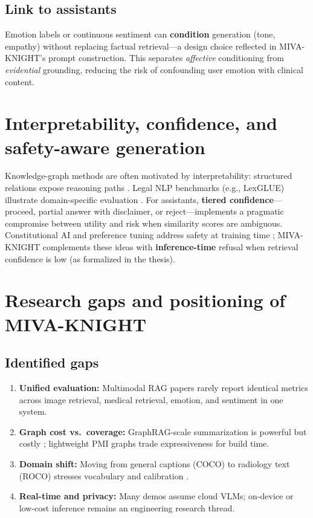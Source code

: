 \documentclass[12pt,a4paper]{article}
\begin{document}
\subsection{Link to assistants}

Emotion labels or continuous sentiment can \textbf{condition} generation (tone, empathy) without replacing factual retrieval---a design choice reflected in MIVA-KNIGHT's prompt construction. This separates \emph{affective} conditioning from \emph{evidential} grounding, reducing the risk of confounding user emotion with clinical content.

\section{Interpretability, confidence, and safety-aware generation}
\label{sec:xai}

Knowledge-graph methods are often motivated by interpretability: structured relations expose reasoning paths \cite{pan2024unifying}. Legal NLP benchmarks (e.g., LexGLUE) illustrate domain-specific evaluation \cite{chalkidis2022lexglue}. For assistants, \textbf{tiered confidence}---proceed, partial answer with disclaimer, or reject---implements a pragmatic compromise between utility and risk when similarity scores are ambiguous. Constitutional AI and preference tuning address safety at training time \cite{bai2022constitutional,ouyang2022training}; MIVA-KNIGHT complements these ideas with \textbf{inference-time} refusal when retrieval confidence is low (as formalized in the thesis).

\section{Research gaps and positioning of MIVA-KNIGHT}

\subsection{Identified gaps}

\begin{enumerate}[leftmargin=1.5em]
  \item \textbf{Unified evaluation:} Multimodal RAG papers rarely report identical metrics across image retrieval, medical retrieval, emotion, and sentiment in one system.
  \item \textbf{Graph cost vs.\ coverage:} GraphRAG-scale summarization is powerful but costly \cite{edge2024graphrag}; lightweight PMI graphs trade expressiveness for build time.
  \item \textbf{Domain shift:} Moving from general captions (COCO) to radiology text (ROCO) stresses vocabulary and calibration \cite{pelka2018radiology}.
  \item \textbf{Real-time and privacy:} Many demos assume cloud VLMs; on-device or low-cost inference remains an engineering research thread.
\end{enumerate}
\end{document}
